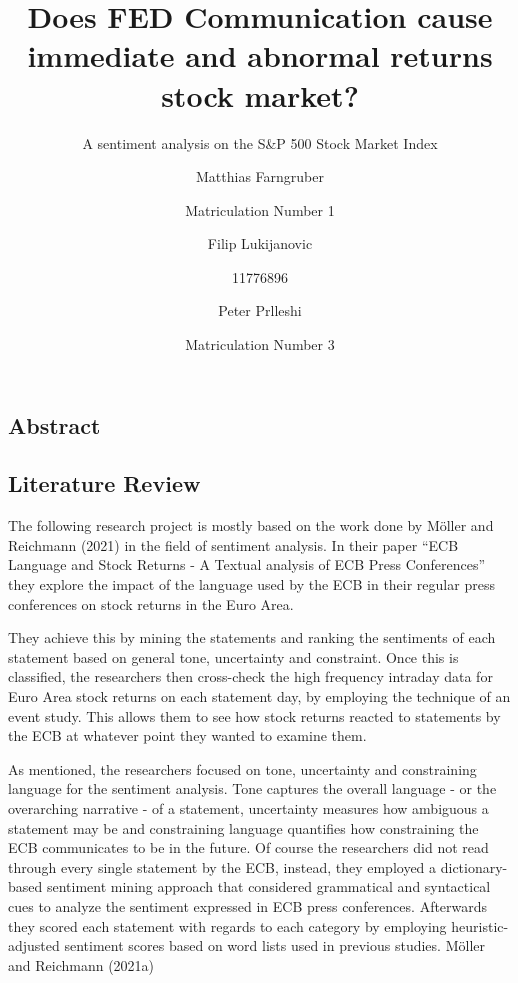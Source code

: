 \documentclass[
]{article}
\title{Does FED Communication cause immediate and abnormal returns stock
market?}
\subtitle{A sentiment analysis on the S\&P 500 Stock Market Index}
\author{Matthias Farngruber \and Matriculation Number 1 \and Filip
Lukijanovic \and 11776896 \and Peter Prlleshi \and Matriculation Number
3}
\date{}
\begin{document}
\maketitle

\tableofcontents
\pagebreak

\hypertarget{sec-abstract}{%
\subsection{Abstract}\label{sec-abstract}}

\pagebreak

\hypertarget{sec-literature-review}{%
\subsection{Literature Review}\label{sec-literature-review}}

The following research project is mostly based on the work done by
Möller and Reichmann (2021) in the field of sentiment analysis. In their
paper ``ECB Language and Stock Returns - A Textual analysis of ECB Press
Conferences'' they explore the impact of the language used by the ECB in
their regular press conferences on stock returns in the Euro Area.

They achieve this by mining the statements and ranking the sentiments of
each statement based on general tone, uncertainty and constraint. Once
this is classified, the researchers then cross-check the high frequency
intraday data for Euro Area stock returns on each statement day, by
employing the technique of an event study. This allows them to see how
stock returns reacted to statements by the ECB at whatever point they
wanted to examine them.

As mentioned, the researchers focused on tone, uncertainty and
constraining language for the sentiment analysis. Tone captures the
overall language - or the overarching narrative - of a statement,
uncertainty measures how ambiguous a statement may be and constraining
language quantifies how constraining the ECB communicates to be in the
future. Of course the researchers did not read through every single
statement by the ECB, instead, they employed a dictionary-based
sentiment mining approach that considered grammatical and syntactical
cues to analyze the sentiment expressed in ECB press conferences.
Afterwards they scored each statement with regards to each category by
employing heuristic-adjusted sentiment scores based on word lists used
in previous studies. Möller and Reichmann (2021a)
\end{document}
